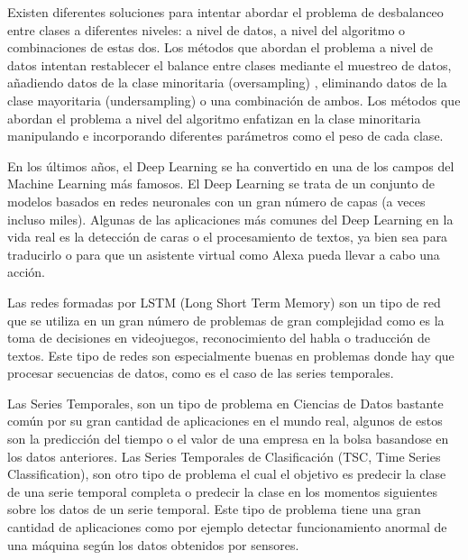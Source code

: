 Existen diferentes soluciones para intentar abordar el problema de desbalanceo entre clases a diferentes niveles: a nivel de datos, a nivel del algoritmo o combinaciones de estas dos. Los métodos que abordan el problema a nivel de datos intentan restablecer el balance entre clases mediante el muestreo de datos, añadiendo datos de la clase minoritaria (oversampling) \cite{chawla2002smote,he2008adasyn,barua2012mwmote}, eliminando datos de la clase mayoritaria (undersampling) o una combinación de ambos. Los métodos que abordan el problema a nivel del algoritmo enfatizan en la clase minoritaria manipulando e incorporando diferentes parámetros como el peso de cada clase.\newline

En los últimos años, el Deep Learning se ha convertido en una de los campos del Machine Learning más famosos. El Deep Learning se trata de un conjunto de modelos basados en redes neuronales con un gran número de capas (a veces incluso miles). Algunas de las aplicaciones más comunes del Deep Learning en la vida real es la detección de caras o el procesamiento de textos, ya bien sea para traducirlo o para que un asistente virtual como Alexa pueda llevar a cabo una acción.\newline

Las redes formadas por LSTM (Long Short Term Memory) \cite{hochreiter1997long} son un tipo de red que se utiliza en un gran número de problemas de gran complejidad como es la toma de decisiones en videojuegos, reconocimiento del habla o traducción de textos. Este tipo de redes son especialmente buenas en problemas donde hay que procesar secuencias de datos, como  es el caso de las series temporales.\newline

Las Series Temporales, son un tipo de problema en Ciencias de Datos bastante común por su gran cantidad de aplicaciones en el mundo real, algunos de estos son la predicción del tiempo o el valor de una empresa en la bolsa basandose en los datos anteriores.\newline
\newpage
Las Series Temporales de Clasificación (TSC, Time Series Classification), son otro tipo de problema el cual el objetivo es predecir la clase de una serie temporal completa o predecir la clase en los momentos siguientes sobre los datos de un serie temporal. Este tipo de problema tiene una gran cantidad de aplicaciones \cite{liang2013effective,cao2013integrated,cao2014parsimonious,geng2018cost,roychoudhury2017cost,xu2018spatio,he2017uncertainty,swapna2018automated,karim2017lstm} como por ejemplo detectar funcionamiento anormal de una máquina según los datos obtenidos por sensores.

